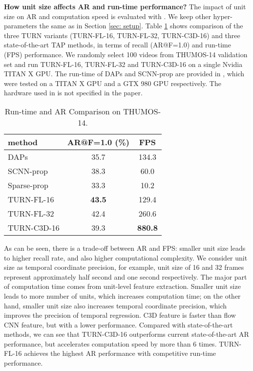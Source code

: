 \documentclass[10pt,twocolumn,letterpaper]{article}
\begin{document}
\textbf{How unit size affects AR and run-time performance?}
The impact of unit size on AR and computation speed is evaluated with . We keep other hyper-parameters the same as in Section \ref{sec: setup}. Table \ref{tbl:fps} shows comparison of the three TURN variants (TURN-FL-16, TURN-FL-32, TURN-C3D-16) and three state-of-the-art TAP methods, in terms of recall (AR@F=1.0) and run-time (FPS) performance. We randomly select 100 videos from THUMOS-14 validation set and run TURN-FL-16, TURN-FL-32 and TURN-C3D-16 on a single Nvidia TITAN X GPU. The run-time of DAPs \cite{escorcia2016daps} and SCNN-prop \cite{Shou_2016_CVPR} are provided in \cite{escorcia2016daps}, which were tested on a TITAN X GPU and a GTX 980 GPU respectively. The hardware used in \cite{Heilbron_2016_CVPR} is not specified in the paper.
\begin{table}[h]
\centering
\caption{Run-time and AR Comparison on THUMOS-14.}
\label{tbl:fps}
\begin{tabular}{l|cc}
\hline
method      & AR@F=1.0 (\%) & FPS   \\ \hline
DAPs \cite{escorcia2016daps}        & 35.7     & 134.3 \\
SCNN-prop \cite{Shou_2016_CVPR}   & 38.3     & 60.0  \\
Sparse-prop \cite{Heilbron_2016_CVPR} & 33.3     & 10.2  \\ \hline 
TURN-FL-16     & \textbf{43.5}     & 129.4 \\
TURN-FL-32     & 42.4     & 260.6 \\
TURN-C3D-16     & 39.3     & \textbf{880.8} \\ \hline
\end{tabular}
\end{table}

As can be seen, there is a trade-off between AR and FPS: smaller unit size leads to higher recall rate, and also higher computational complexity. We consider unit size as temporal coordinate precision, for example,  unit size of 16 and 32 frames represent approximately half second and one second respectively. The major part of computation time comes from unit-level feature extraction. Smaller unit size leads to more number of units, which increases computation time; on the other hand, smaller unit size also increases temporal coordinate precision, which improves the precision of temporal regression. C3D feature is faster than flow CNN feature, but with a lower performance. Compared with state-of-the-art methods, we can see that TURN-C3D-16 outperforms current state-of-the-art AR performance, but accelerates computation speed by more than 6 times. TURN-FL-16 achieves the highest AR performance with competitive run-time performance. 
\end{document}

